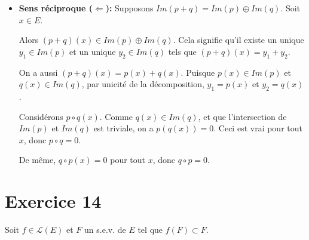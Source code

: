 \documentclass[french]{yLectureNote}
\begin{document}
\begin{enumerate}
\begin{itemize}
\begin{itemize}
            Donc $(p+q)(y)=p(y_1)+0+0+q(y_2)=y_1+y_2=y$.

            Donc $y \in Im(p+q)$, ce qui montre $Im(p)+Im(q) \subset Im(p+q)$. L'inclusion inverse est toujours vraie.
        \end{itemize}
        \item \textbf{Sens réciproque ($\Leftarrow$):} Supposons $Im(p+q)=Im(p)\oplus Im(q)$.
        Soit $x \in E$.

        Alors $(p+q)(x) \in Im(p)\oplus Im(q)$. Cela signifie qu'il existe un unique $y_1 \in Im(p)$ et un unique $y_2 \in Im(q)$ tels que $(p+q)(x)=y_1+y_2$.

        On a aussi $(p+q)(x)=p(x)+q(x)$. Puisque $p(x) \in Im(p)$ et $q(x) \in Im(q)$, par unicité de la décomposition, $y_1=p(x)$ et $y_2=q(x)$.

        Considérons $p\circ q(x)$. Comme $q(x) \in Im(q)$, et que l'intersection de $Im(p)$ et $Im(q)$ est triviale, on a $p(q(x))=0$. Ceci est vrai pour tout $x$, donc $p\circ q=0$.

        De même, $q\circ p(x)=0$ pour tout $x$, donc $q\circ p=0$.
    \end{itemize}
\end{enumerate}
\section{Exercice 14}

Soit $f \in \mathcal{L}(E)$ et $F$ un s.e.v. de $E$ tel que $f(F) \subset F$.
\end{document}
